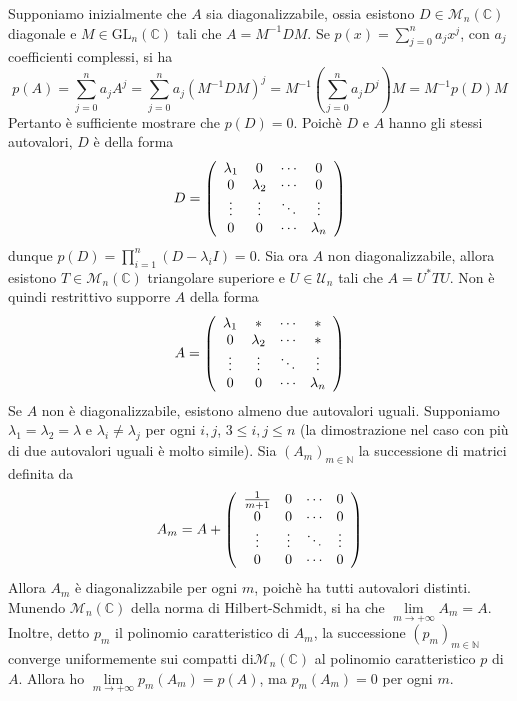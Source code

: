 \documentclass[a4paper,11pt]{article}
\begin{document}
\noindent Supponiamo inizialmente che $A$ sia diagonalizzabile, ossia esistono $D\in\mathcal{M}_n(\mathbb{C})$ diagonale e $M\in\mathrm{GL}_n(\mathbb{C})$ tali che $A=M^{-1}DM$. Se $p(x)=\sum_{j=0}^{n}a_jx^j$, con $a_j$ coefficienti complessi, si ha
\[p(A)=\sum_{j=0}^{n}a_jA^j=\sum_{j=0}^{n}a_j(M^{-1}DM)^j=M^{-1}\left(\sum_{j=0}^{n}a_jD^j\right)M=M^{-1}p(D)M\]
Pertanto è sufficiente mostrare che $p(D)=0$. Poichè $D$ e $A$ hanno gli stessi autovalori, $D$ è della forma
\[D=\left(\begin{array}{c c c c}
\lambda_1&0&\cdots&0\\
0&\lambda_2&\cdots&0\\
\vdots &\vdots&\ddots&\vdots\\
0&0&\cdots&\lambda_n\\
\end{array}\right)\]
dunque $p(D)=\prod_{i=1}^{n}(D-\lambda_iI)=0$. Sia ora $A$ non diagonalizzabile, allora esistono $T\in\mathcal{M}_n(\mathbb{C})$ triangolare superiore e $U\in \mathcal{U}_n$ tali che $A=U^*TU$. Non è quindi restrittivo supporre $A$ della forma
\[A=\left(\begin{array}{c c c c}
\lambda_1 &* &\cdots&*\\
0&\lambda_2&\cdots&*\\
\vdots&\vdots&\ddots&\vdots\\
0&0&\cdots&\lambda_n\\
\end{array}\right)\]
Se $A$ non è diagonalizzabile, esistono almeno due autovalori uguali. Supponiamo $\lambda_1=\lambda_2=\lambda$ e $\lambda_i\neq\lambda_j$ per ogni $i,j$, $3\leq i,j\leq n$ (la dimostrazione nel caso con più di due autovalori uguali è molto simile). Sia $(A_m)_{m\in\mathbb{N}}$ la successione di matrici definita da
\[A_m=A+\left(\begin{array}{c c c c}
\frac{1}{m+1}&0&\cdots&0\\
0&0&\cdots&0\\
\vdots&\vdots&\ddots&\vdots\\
0&0&\cdots&0\\
\end{array}\right)\]
Allora $A_m$ è diagonalizzabile per ogni $m$, poichè ha tutti autovalori distinti. Munendo $\mathcal{M}_n(\mathbb{C})$ della norma di Hilbert-Schmidt, si ha che $\lim\limits_{m\to+\infty}A_m=A$. Inoltre, detto $p_m$ il polinomio caratteristico di $A_m$, la successione $(p_m)_{m\in\mathbb{N}}$ converge uniformemente sui compatti di$\mathcal{M}_n(\mathbb{C})$ al polinomio caratteristico $p$ di $A$. Allora ho $\lim\limits_{m\to+\infty}p_m(A_m)=p(A)$, ma $p_m(A_m)=0$ per ogni $m$.
\end{document}
